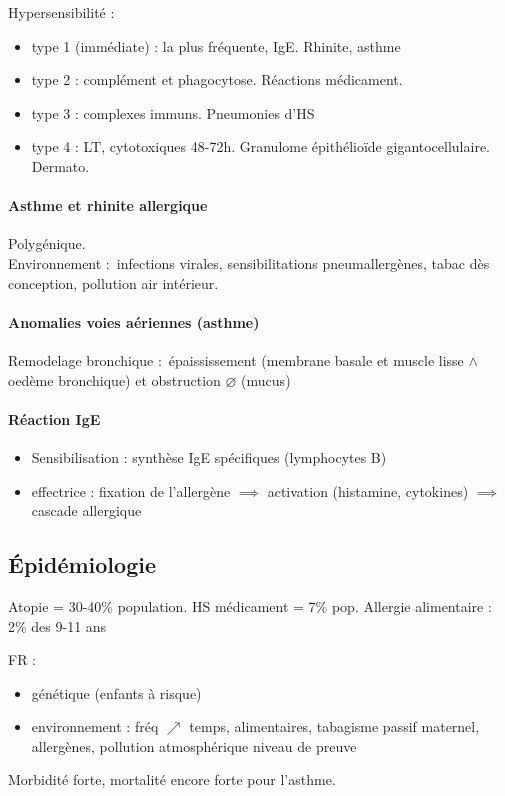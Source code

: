 Hypersensibilité :
\begin{itemize}
\item type 1 (immédiate) : la plus fréquente, IgE. Rhinite, asthme
\item type 2 : complément et phagocytose. Réactions médicament.
\item type 3 : complexes immuns. Pneumonies d'HS
\item type 4 : LT, cytotoxiques 48-72h. Granulome épithélioïde gigantocellulaire.
  Dermato.
\end{itemize}

\paragraph{Asthme et rhinite allergique}
Polygénique.\\
Environnement : infections virales, sensibilitations pneumallergènes, tabac dès
conception, pollution air intérieur. 

\paragraph{Anomalies voies aériennes (asthme)}
Remodelage bronchique : épaississement (membrane basale et muscle lisse $\wedge$ oedème
bronchique) et obstruction $\diameter$ (mucus)

\paragraph{Réaction IgE}
\begin{itemize}
\item Sensibilisation : synthèse IgE spécifiques (lymphocytes B)
\item effectrice : fixation de l'allergène $\implies$ activation (histamine,
  cytokines) $\implies$ cascade allergique
\end{itemize}

\subsection{Épidémiologie}
Atopie = 30-40\% population. HS médicament = 7\% pop. Allergie alimentaire : 2\%
des 9-11 ans

FR : 
\begin{itemize}
\item génétique (enfants à risque)
\item environnement : fréq $\nearrow$ temps, alimentaires, tabagisme passif
  maternel, allergènes, pollution atmosphérique \danger niveau de preuve 
\end{itemize}
Morbidité forte, mortalité encore forte pour l'asthme.

